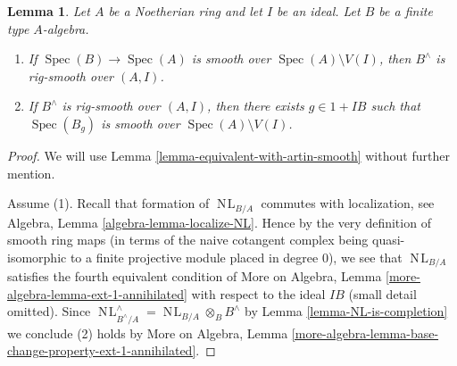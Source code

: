 \documentclass{stacks-project}
\theoremstyle{plain}
\newtheorem{lemma}[subsection]{Lemma}
\theoremstyle{definition}
\theoremstyle{remark}
\numberwithin{equation}{subsection}
\def\Spec{\mathop{\mathrm{Spec}}}
\def\NL{\mathop{N\!L}\nolimits}
\begin{document}
\begin{lemma}
\label{lemma-rig-smooth}
Let $A$ be a Noetherian ring and let $I$ be an ideal.
Let $B$ be a finite type $A$-algebra.
\begin{enumerate}
\item If $\Spec(B) \to \Spec(A)$ is smooth over $\Spec(A) \setminus V(I)$,
then $B^\wedge$ is rig-smooth over $(A, I)$.
\item If $B^\wedge$ is rig-smooth over $(A, I)$,
then there exists $g \in 1 + IB$ such that $\Spec(B_g)$ is smooth
over $\Spec(A) \setminus V(I)$.
\end{enumerate}
\end{lemma}

\begin{proof}
We will use Lemma \ref{lemma-equivalent-with-artin-smooth}
without further mention.

\medskip\noindent
Assume (1). Recall that formation of $\NL_{B/A}$ commutes with
localization, see Algebra, Lemma \ref{algebra-lemma-localize-NL}.
Hence by the very definition of smooth ring maps (in terms of
the naive cotangent complex being quasi-isomorphic to a finite
projective module placed in degree $0$), we see that
$\NL_{B/A}$ satisfies the fourth equivalent condition
of More on Algebra, Lemma \ref{more-algebra-lemma-ext-1-annihilated}
with respect to the ideal $IB$ (small detail omitted).
Since $\NL_{B^\wedge/A}^\wedge = \NL_{B/A} \otimes_B B^\wedge$
by Lemma \ref{lemma-NL-is-completion} we conclude (2) holds by
More on Algebra, Lemma
\ref{more-algebra-lemma-base-change-property-ext-1-annihilated}.


\end{proof}
\end{document}
